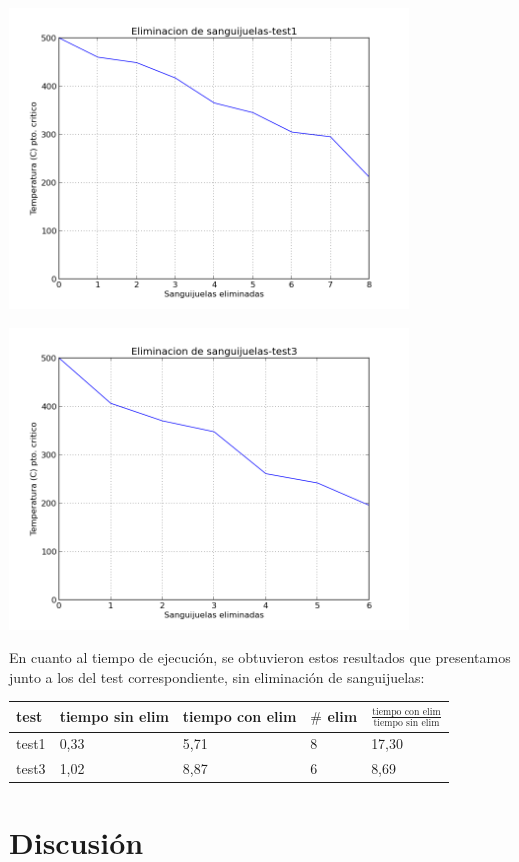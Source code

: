 \documentclass[a4paper]{article}
\begin{document}
\includegraphics[width=300pt]{img/elim1.png} 

\includegraphics[width=300pt]{img/elim3.png} 

En cuanto al tiempo de ejecución, se obtuvieron estos resultados que presentamos junto a los del test correspondiente, sin eliminación de sanguijuelas: \smallskip \newline

\begin{tabular}{ l |l l l l}
  test & tiempo sin elim & tiempo con elim & $\#$ elim & $\frac{\text{tiempo con elim}}{\text{tiempo sin elim}}$\\
  \hline
  test1 & 0,33 & 5,71 & 8 & 17,30\\
  test3 & 1,02 & 8,87 & 6 & 8,69
\end{tabular} 


\newpage

\section{Discusi\'{o}n}
\label{sec:discusion}
\end{document}
